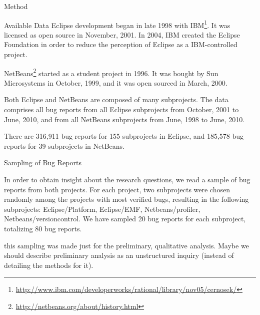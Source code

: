 \begin{section}{Method}
\begin{subsection}{Available Data}
	Eclipse development began in late 1998 with IBM\footnote{\url{http://www.ibm.com/developerworks/rational/library/nov05/cernosek/}}. It was licensed as open source in November, 2001. In 2004, IBM created the Eclipse Foundation in order to reduce the perception of Eclipse as a IBM-controlled project.
	
	NetBeans\footnote{\url{http://netbeans.org/about/history.html}} started  as a student project in 1996. It was bought by Sun Microsystems in October, 1999, and it was open sourced in March, 2000.

	Both Eclipse and NetBeans are composed of many subprojects. The data comprises all bug reports from all Eclipse subprojects from October, 2001 to June, 2010, and from all NetBeans subprojects from June, 1998 to June, 2010.
	
	There are 316,911 bug reports for 155 subprojects in Eclipse, and 185,578 bug reports for 39 subprojects in NetBeans.
	
\end{subsection}

\begin{subsection}{Sampling of Bug Reports}
	
	In order to obtain insight about the research questions, we read a sample of bug reports from both projects. For each project, two subprojects were chosen randomly among the projects with most verified bugs, resulting in the following subprojects: Eclipse/Platform, Eclipse/EMF, Netbeans/profiler, Netbeans/versioncontrol. We have sampled 20 bug reports for each subproject, totalizing 80 bug reports.
	
	\TODO this sampling was made just for the preliminary, qualitative analysis. Maybe we should describe preliminary analysis as an unstructured inquiry (instead of detailing the methods for it).
	
\end{subsection}

\end{section}

